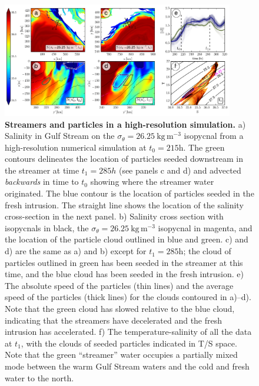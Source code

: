 \documentclass{natureJMK}
\begin{document}
\begin{figure}[htbp]
  \centering
    \includegraphics[width=0.9\textwidth]{./StreamersModel.png}
  \caption{{\bf Streamers and particles in a high-resolution simulation.}
a) Salinity in Gulf Stream on the $\sigma_{\theta}=26.25\  \mathrm{kg\,m^{-3}}$ isopycnal from a high-resolution numerical simulation at $t_0=215 \mathrm{h}$.  The green contours delineates the location of particles seeded downstream in the streamer at time $t_1=285 h$ (see panels c and d) and advected \emph{backwards} in time to $t_0$ showing where the streamer water originated. The blue contour is the location of particles seeded in the fresh intrusion.  The straight line shows the location of the salinity cross-section in the next panel.  b) Salinity cross section with isopycnals in black, the $\sigma_{\theta}=26.25\  \mathrm{kg\,m^{-3}}$ isopycnal in magenta, and the location of the particle cloud outlined in blue and green.  c) and d) are the same as a) and b) except for $t_1=285 \mathrm{h}$; the  cloud of particles outlined in green has been seeded in the streamer at this time, and the blue cloud has been seeded in the fresh intrusion.  e) The absolute speed of the particles (thin lines) and the average speed of the particles (thick lines) for the clouds contoured in a)--d).  Note that the green cloud has slowed relative to the blue cloud, indicating that the streamers have decelerated and the fresh intrusion has accelerated.  f) The temperature-salinity of all the data at $t_1$, with the clouds of seeded particles indicated in T/S space.  Note that the green ``streamer'' water occupies a partially mixed mode between the warm Gulf Stream waters and the cold and fresh water to the north.  
  } \label{fig:StreamersModel}
\end{figure}





\end{document}
